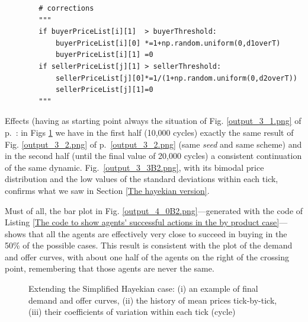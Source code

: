 \documentclass[10pt]{report}
\begin{document}
\begin{appendices}
\begin{lstlisting}
        # corrections
        """
        if buyerPriceList[i][1]  > buyerThreshold:
            buyerPriceList[i][0] *=1+np.random.uniform(0,d1overT)
            buyerPriceList[i][1] =0
        if sellerPriceList[j][1] > sellerThreshold:
            sellerPriceList[j][0]*=1/(1+np.random.uniform(0,d2overT))
            sellerPriceList[j][1]=0
        """   
\end{lstlisting}

Effects (having as starting point always the situation of Fig. \ref{output_3_1.png} of p.~\pageref{output_3_1.png}: in Figs \ref{output_3_2B2.png} we have in the first half (10,000 cycles) exactly the same result of Fig. \ref{output_3_2.png} of p.~\ref{output_3_2.png} (same \emph{seed} and same scheme) and in the second half (until the final value of 20,000 cycles) a consistent continuation of the same dynamic. Fig.~\ref{output_3_3B2.png}, with its bimodal price distribution and the low values of the standard deviations within each tick, confirms what we saw in Section \ref{The hayekian version}.

Must of all, the bar plot in Fig. \ref{output_4_0B2.png}---generated with the code of Listing \ref{The code to show agents' successful actions in the by product case}---shows that all the agents are effectively very close to succeed in buying in the 50\% of the possible cases. This result is consistent with the plot of the demand and offer curves, with about one half of the agents on the right of the crossing point, remembering  that those agents are never the same.

\begin{figure}[H]
\begin{center}
\caption{Extending the Simplified Hayekian case: (i) an example of final demand and offer curves, (ii) the history of mean prices tick-by-tick, (iii) their coefficients of variation within each tick (cycle)}
\label{output_3_2B2.png}
\end{center}
\end{figure}


\end{appendices}
\end{document}
